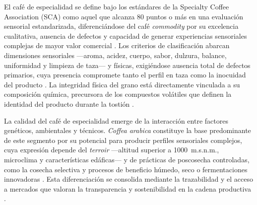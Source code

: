 El café de especialidad se define bajo los estándares de la Specialty Coffee Association 
(SCA) como aquel que alcanza 80 puntos o más en una evaluación sensorial estandarizada, 
diferenciándose del café \textit{commodity} por su excelencia cualitativa, ausencia de 
defectos y capacidad de generar experiencias sensoriales complejas de mayor valor 
comercial \parencite{barbosa_sensory_2019, carmo_quality_2020, febrianto_coffee_2023, 
gallardo-ignacio_chemical_2023, tieghi_effects_2024}. Los criterios de clasificación 
abarcan dimensiones sensoriales —aroma, acidez, cuerpo, sabor, dulzura, balance, 
uniformidad y limpieza de taza— y físicas, exigiéndose ausencia total de defectos 
primarios, cuya presencia compromete tanto el perfil en taza como la inocuidad del 
producto \parencite{febrianto_coffee_2023, barbosa_sensory_2019, carmo_quality_2020, 
dias_alixandre_physical_2023, elhalis_role_2021, tieghi_effects_2024, 
escuela_superior_politecnica_agropecuaria_de_manabi_manuel_felix_lopez_carrera_de_ingenieria_agricola_postharvest_2023}. 
La integridad física del grano está directamente vinculada a su composición química, 
precursora de los compuestos volátiles que definen la identidad del producto durante 
la tostión \parencite{escuela_superior_politecnica_agropecuaria_de_manabi_manuel_felix_lopez_carrera_de_ingenieria_agricola_postharvest_2023, 
tieghi_effects_2024}.

La calidad del café de especialidad emerge de la interacción entre factores genéticos, 
ambientales y técnicos. \textit{Coffea arabica} constituye la base predominante de 
este segmento por su potencial para producir perfiles sensoriales complejos, cuya 
expresión depende del \textit{terroir} —altitud superior a 1000~m.s.n.m., 
microclima y características edáficas— y de prácticas de poscosecha controladas, 
como la cosecha selectiva y procesos de beneficio húmedo, seco o fermentaciones 
innovadoras \parencite{dias_alixandre_physical_2023, ferreira_impact_2024, 
park_comparative_2025, carmo_quality_2020, febrianto_coffee_2023, hasan_comparative_2024, 
tieghi_effects_2024, barbosa_sensory_2019, de_bruyn_exploring_2017, 
ferreira_bernardes_pereira_influence_2020, 
escuela_superior_politecnica_agropecuaria_de_manabi_manuel_felix_lopez_carrera_de_ingenieria_agricola_postharvest_2023}. 
Esta diferenciación se consolida mediante la trazabilidad y el acceso a mercados que 
valoran la transparencia y sostenibilidad en la cadena productiva 
\parencite{dias_alixandre_physical_2023, hasan_comparative_2024, tieghi_effects_2024}.

